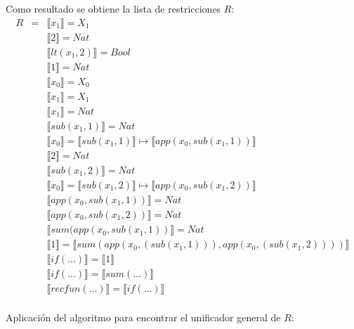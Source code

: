 \begin{exercise}
\begin{description}
           \item Como resultado se obtiene la lista de restricciones $R$:
            \[
                \begin{array}{rclr}
                R&=&  \llbracket x_1 \rrbracket = X_1  \\
                &&  \llbracket 2 \rrbracket = Nat\\
                &&  \llbracket lt(x_1 , 2) \rrbracket = Bool\\
                &&  \llbracket 1 \rrbracket = Nat\\
                &&  \llbracket x_0 \rrbracket = X_0 \\
                &&  \llbracket x_1 \rrbracket = X_1 \\
                &&  \llbracket x_1 \rrbracket = Nat\\
                &&  \llbracket sub(x_1,1) \rrbracket = Nat \\
                &&  \llbracket x_0 \rrbracket =  \llbracket sub(x_1,1) \rrbracket \mapsto  \llbracket app(x_0, sub(x_1,1)) \rrbracket\\
                &&  \llbracket 2 \rrbracket = Nat \\
                &&  \llbracket sub(x_1,2) \rrbracket = Nat \\
                &&  \llbracket x_0 \rrbracket =  \llbracket sub(x_1,2) \rrbracket \mapsto  \llbracket app(x_0, sub(x_1,2)) \rrbracket \\
                &&  \llbracket app(x_0, sub(x_1,1)) \rrbracket = Nat \\
                &&  \llbracket app(x_0, sub(x_1,2)) \rrbracket = Nat \\	
	      &&   \llbracket sum(app(x_0, sub(x_1,1)) \rrbracket = Nat \\
                &&  \llbracket 1 \rrbracket =  \llbracket sum(app(x_0, (sub(x_1,1))), app(x_0, (sub(x_1,2)))) \rrbracket \\
                &&  \llbracket if(...) \rrbracket =  \llbracket 1 \rrbracket\\
                &&  \llbracket if(...) \rrbracket =  \llbracket sum(...) \rrbracket \\
                &&  \llbracket recfun(...) \rrbracket =  \llbracket if(...) \rrbracket \\
                \end{array}
            \]

           \item Aplicación del algoritmo para encontrar el unificador general de $R$:


\end{description}
\end{exercise}

